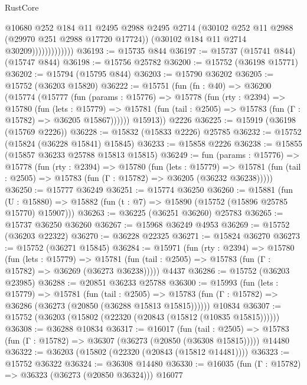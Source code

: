 \begin{lexlean}{RustCore}
\begin{coremodule}
                            @10680
                            @252
                            @184
                            @11
                            @2495
                            @2988
                            @2495
                            @2714
                            (@30102 @252 @11 @2988 (@29970 @251 @2988 @17720 @17724))
                            (@30102 @184 @11 @2714 @30209)))))))))))))
@36193 := @15735 @844
@36197 := @15737 (@15741 @844) (@15747 @844)
@36198 := @15756 @25782
@36200 := @15752 (@36198 @15771)
@36202 := @15794 (@15795 @844)
@36203 := @15790 @36202
@36205 := @15752 (@36203 @15820)
@36222 := @15751
    (fun (fn : @40) =>
    @36200
      (@15774
        (@15777
          (fun (params : @15776) =>
          @15778
            (fun (rty : @2394) =>
            @15780
              (fun (lets : @15779) =>
              @15781 (fun (tail : @2505) => @15783 (fun (Γ : @15782) => @36205 @15867))))))
        @15913))
    @2226
@36225 := @15919 (@36198 (@15769 @2226))
@36228 := @15832 (@15833 @2226) @25785
@36232 := @15752 (@15824 (@36228 @15841) @15845)
@36233 := @15858 @2226
@36238 := @15855 (@15857 @36233 @25788 @15813 @15815)
@36249 := fun (params : @15776) =>
  @15778
    (fun (rty : @2394) =>
    @15780
      (fun (lets : @15779) =>
      @15781 (fun (tail : @2505) => @15783 (fun (Γ : @15782) => @36205 (@36232 @36238)))))
@36250 := @15777 @36249
@36251 := @15774 @36250
@36260 := @15881
    (fun (U : @15880) => @15882 (fun (t : @7) => @15890 (@15752 (@15896 @25785 @15770) @15907)))
@36263 := @36225 (@36251 @36260) @25783
@36265 := @15737 @36250 @36260
@36267 := @15968 @36249 @4953
@36269 := @15752 (@36203 @22322)
@36270 := @36228 @22325
@36271 := @15824 @36270
@36273 := @15752 (@36271 @15845)
@36284 := @15971
    (fun (rty : @2394) =>
    @15780
      (fun (lets : @15779) =>
      @15781 (fun (tail : @2505) => @15783 (fun (Γ : @15782) => @36269 (@36273 @36238)))))
    @4437
@36286 := @15752 (@36203 @23985)
@36288 := @20851 @36233 @25788
@36300 := @15993
    (fun (lets : @15779) =>
    @15781
      (fun (tail : @2505) =>
      @15783 (fun (Γ : @15782) => @36286 (@36273 (@20850 (@36288 @15813 @15815))))))
    @10834
@36307 := @15752 (@36203 (@15802 (@22320 (@20843 (@15812 (@10835 @15815))))))
@36308 := @36288 @10834
@36317 := @16017
    (fun (tail : @2505) => @15783 (fun (Γ : @15782) => @36307 (@36273 (@20850 (@36308 @15815)))))
    @14480
@36322 := @36203 (@15802 (@22320 (@20843 (@15812 @14481))))
@36323 := @15752 @36322
@36324 := @36308 @14480
@36330 := @16035 (fun (Γ : @15782) => @36323 (@36273 (@20850 @36324))) @16077

\end{coremodule}
\end{lexlean}
